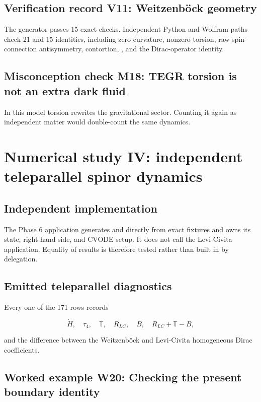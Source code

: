 \documentclass[11pt]{article}
\begin{document}
\subsection{Verification record V11: Weitzenböck geometry}

The generator passes 15 exact checks. Independent Python and Wolfram paths check 21 and 15 identities, including zero curvature, nonzero torsion, raw spin-connection antisymmetry, contortion, \texttt{}, and the Dirac-operator identity.

\subsection{Misconception check M18: TEGR torsion is not an extra dark fluid}

In this model torsion rewrites the gravitational sector. Counting it again as independent matter would double-count the same dynamics.

\section{Numerical study IV: independent teleparallel spinor dynamics}

\subsection{Independent implementation}

The Phase 6 application generates \texttt{} and \texttt{} directly from exact fixtures and owns its state, right-hand side, and CVODE setup. It does not call the Levi-Civita application. Equality of results is therefore tested rather than built in by delegation.

\subsection{Emitted teleparallel diagnostics}

Every one of the 171 rows records

\[
\dot H,\quad\tau_4,\quad\mathbb T,\quad R_{LC},\quad B,
\quad R_{LC}+\mathbb T-B,
\]

and the difference between the Weitzenböck and Levi-Civita homogeneous Dirac coefficients.

\subsection{Worked example W20: Checking the present boundary identity}
\end{document}
